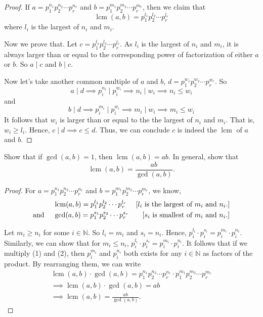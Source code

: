 \documentclass[12pt]{article}
\newenvironment{exercise}[2][Exercise]{\begin{trivlist}
\item[\hskip \labelsep {\bfseries #1}\hskip \labelsep {\bfseries #2.}]}{\end{trivlist}}
\DeclareMathOperator{\lcm}{lcm}
\begin{document}
\begin{proof}
If $a=p_1^{n_1} p_2^{n_2} \cdots p_r^{n_r}$ and $b = p_1^{m_1} p_2^{m_2} \cdots p_r^{m_r}$, then we claim that
\[
\lcm(a,b) = p_1^{l_1} p_2^{l_2} \cdots p_r^{l_r}
\]
where $l_i$ is the largest of $n_i$ and $m_i$. 

Now we prove that. Let $c=p_1^{l_1} p_2^{l_2} \cdots p_r^{l_r}$. As $l_i$ is the largest of $n_i$ and $m_i$, it is always larger than or equal to the corresponding power of factorization of either $a$ or $b$. So $a\mid c$ and $b\mid c$.

Now let's take another common multiple of $a$ and $b$, $d=p_1^{w_1} p_2^{w_2} \cdots p_r^{w_r}$. So
\[
a \mid d \implies p_i^{n_i} \mid p_i^{w_i} \implies n_i \mid w_i \implies n_i \leq w_i
\]
and 
\[
b \mid d \implies p_i^{m_i} \mid p_i^{w_i} \implies m_i \mid w_i \implies m_i \leq w_i
\]
It follows that $w_i$ is larger than or equal to the the largest of $n_i$ and $m_i$. That is, $w_i \geq l_i$. Hence, $c \mid d \implies c\leq d$. Thus, we can conclude $c$ is indeed the $\lcm$ of $a$ and $b$.
\end{proof}

\begin{exercise}{12}
Show that if \( \gcd(a, b) = 1 \), then \( \lcm(a, b) = ab \). In general, show that \[ \lcm(a, b) = \frac{ab}{\gcd(a, b)}. \]
\end{exercise}

\begin{proof}
For $a=p_1^{n_1} p_2^{n_2} \cdots p_r^{n_r}$ and $b = p_1^{m_1} p_2^{m_2} \cdots p_r^{m_r}$, we know,
\begin{align}
& \lcm(a,b) = p_1^{l_1} p_2^{l_2} \cdots p_r^{l_r} & \text{[$l_i$ is the largest of $m_i$ and $n_i$.]} \\
\text{and \quad} & \gcd(a, b) = p_1^{s_1} p_2^{s_2} \cdots p_r^{s_r} & \text{[$s_i$ is smallest of $m_i$ and $n_i$.]}
\end{align}

Let $m_i \geq n_i$ for some $i \in \mathbb{N}$. So $l_i=m_i$ and $s_i=n_i$. Hence, $p_i^{l_i}\cdot p_i^{s_i} = p_i^{m_i}\cdot p_i^{n_i}$. Similarly, we can show that for $m_i\leq n_i$, $p_i^{l_i}\cdot p_i^{s_i} = p_i^{m_i}\cdot p_i^{n_i}$. It follows that if we multiply (1) and (2), then $p_i^{m_i}$ and $p_i^{n_i}$ both exists for any $i\in \mathbb{N}$ as factors of the product. By rearranging them, we can write
\begin{gather*}
\lcm(a,b)\cdot \gcd(a,b)=p_1^{n_1} p_2^{n_2} \cdots p_r^{n_r}\cdot p_1^{m_1} p_2^{m_2} \cdots p_r^{m_r}\\
\implies \lcm(a,b)\cdot \gcd(a,b) = ab \\
\implies \lcm(a, b) = \frac{ab}{\gcd(a, b)}.
\end{gather*}
\end{proof}
\end{document}
